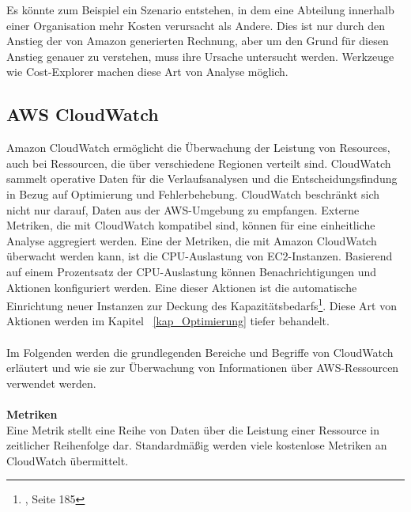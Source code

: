 Es könnte zum Beispiel ein Szenario entstehen, in dem eine Abteilung innerhalb einer Organisation mehr Kosten verursacht als Andere. Dies ist nur durch den Anstieg der von Amazon generierten Rechnung, aber um den Grund für diesen Anstieg genauer zu verstehen, muss ihre Ursache untersucht werden. Werkzeuge wie Cost-Explorer machen diese Art von Analyse möglich.


\subsection{AWS CloudWatch}
Amazon CloudWatch ermöglicht die Überwachung der Leistung von Resources, auch bei Ressourcen, die über verschiedene Regionen verteilt sind. CloudWatch sammelt operative Daten für die Verlaufsanalysen und die Entscheidungsfindung in Bezug auf Optimierung und Fehlerbehebung. CloudWatch beschränkt sich nicht nur darauf, Daten aus der AWS-Umgebung zu empfangen. Externe Metriken, die mit CloudWatch kompatibel sind, können für eine einheitliche Analyse aggregiert werden. Eine der Metriken, die mit Amazon CloudWatch überwacht werden kann, ist die CPU-Auslastung von EC2-Instanzen. Basierend auf einem Prozentsatz der CPU-Auslastung können Benachrichtigungen und Aktionen konfiguriert werden. Eine dieser Aktionen ist die automatische Einrichtung neuer Instanzen zur Deckung des Kapazitätsbedarfs\footnote{\cite{AWS1}, Seite 185}. Diese Art von Aktionen werden im Kapitel ~\ref{kap_Optimierung} tiefer behandelt.
\\\\
Im Folgenden werden die grundlegenden Bereiche und Begriffe von CloudWatch erläutert und wie sie zur Überwachung von Informationen über AWS-Ressourcen verwendet werden.
\\\\
\textbf{Metriken} \\
Eine Metrik stellt eine Reihe von Daten über die Leistung einer Ressource in zeitlicher Reihenfolge dar. Standardmäßig werden viele kostenlose Metriken an CloudWatch übermittelt.

